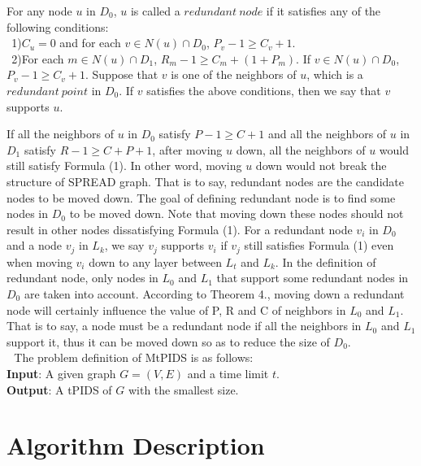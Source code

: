 	\begin{definition}
		For any node $u$ in $D_0$, $u$ is called a $redundant~node$ if it satisfies any of the following conditions:\\
		$~~$1)$C_u = 0$ and for each $v \in N(u) \cap D_0$, $P_v - 1 \ge C_v+1$.\\
		$~~$2)For each $m \in N(u) \cap D_1$, $R_m - 1 \ge C_m + (1+P_m)$. If $v \in N(u) \cap D_0$, $P_v-1 \ge C_v+1$.
		Suppose that $v$ is one of the neighbors of $u$, which is a $redundant~point$ in $D_0$. If $v$ satisfies the above conditions, then we say that $v$ supports $u$.
	\end{definition}
	If all the neighbors of $u$ in $D_0$ satisfy $P-1\ge C+1$ and all the neighbors of $u$ in $D_1$ satisfy $R-1 \ge C+P+1$, after moving $u$ down, all the neighbors of $u$ would still satisfy Formula (1). In other word, moving $u$ down would not break the structure of SPREAD graph. That is to say, redundant nodes are the candidate nodes to be moved down.
	The goal of defining redundant node is to find some nodes in $D_0$ to be moved down. Note that moving down these nodes should not result in other nodes dissatisfying Formula (1). For a redundant node $v_i$ in $D_0$ and a node $v_j$ in $L_k$, we say $v_j$ supports $v_i$ if $v_j$ still satisfies Formula (1) even when moving $v_i$ down to any layer between $L_t$ and $L_k$. In the definition of redundant node, only nodes in $L_0$ and $L_1$ that support some redundant nodes in $D_0$ are taken into account. According to Theorem 4., moving down a redundant node will certainly influence the value of P, R and C of neighbors in $L_0$ and $L_1$. That is to say, a node must be a redundant node if all the neighbors in $L_0$ and $L_1$ support it, thus it can be moved down so as to reduce the size of $D_0$.\\
	$~~~$The problem definition of MtPIDS is as follows:\\
	\noindent \textbf{Input}: A given graph $G = (V ,E)$ and a time limit $t$.\\
	\noindent \textbf{Output}: A tPIDS of $G$ with the smallest size.
\section{Algorithm Description}
